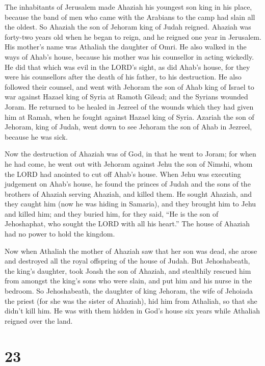  The inhabitants of Jerusalem made Ahaziah his youngest
son king in his place, because the band of men who came with the
Arabians to the camp had slain all the oldest. So Ahaziah the son of
Jehoram king of Judah reigned.  Ahaziah was forty-two
years old when he began to reign, and he reigned one year in Jerusalem.
His mother's name was Athaliah the daughter of Omri.  He
also walked in the ways of Ahab's house, because his mother was his
counsellor in acting wickedly.  He did that which was evil
in the LORD's sight, as did Ahab's house, for they were his counsellors
after the death of his father, to his destruction.  He
also followed their counsel, and went with Jehoram the son of Ahab king
of Israel to war against Hazael king of Syria at Ramoth Gilead; and the
Syrians wounded Joram.  He returned to be healed in
Jezreel of the wounds which they had given him at Ramah, when he fought
against Hazael king of Syria. Azariah the son of Jehoram, king of Judah,
went down to see Jehoram the son of Ahab in Jezreel, because he was
sick.

 Now the destruction of Ahaziah was of God, in that he
went to Joram; for when he had come, he went out with Jehoram against
Jehu the son of Nimshi, whom the LORD had anointed to cut off Ahab's
house.  When Jehu was executing judgement on Ahab's house,
he found the princes of Judah and the sons of the brothers of Ahaziah
serving Ahaziah, and killed them.  He sought Ahaziah, and
they caught him (now he was hiding in Samaria), and they brought him to
Jehu and killed him; and they buried him, for they said, ``He is the son
of Jehoshaphat, who sought the LORD with all his heart.'' The house of
Ahaziah had no power to hold the kingdom.

 Now when Athaliah the mother of Ahaziah saw that her son
was dead, she arose and destroyed all the royal offspring of the house
of Judah.  But Jehoshabeath, the king's daughter, took
Joash the son of Ahaziah, and stealthily rescued him from amongst the
king's sons who were slain, and put him and his nurse in the bedroom. So
Jehoshabeath, the daughter of king Jehoram, the wife of Jehoiada the
priest (for she was the sister of Ahaziah), hid him from Athaliah, so
that she didn't kill him.  He was with them hidden in
God's house six years while Athaliah reigned over the land.

\hypertarget{section-22}{%
\section{23}\label{section-22}}

